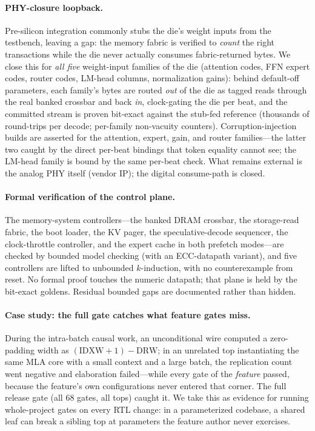 \documentclass[11pt]{article}
\begin{document}
\paragraph{PHY-closure loopback.} Pre-silicon integration commonly stubs the
die's weight inputs from the testbench, leaving a gap: the memory fabric is
verified to \emph{count} the right transactions while the die never actually
consumes fabric-returned bytes. We close this for \emph{all five} weight-input
families of the die (attention codes, FFN expert codes, router codes, LM-head
columns, normalization gains): behind default-off parameters, each family's
bytes are routed \emph{out} of the die as tagged reads through the real banked
crossbar and back \emph{in}, clock-gating the die per beat, and the committed
stream is proven bit-exact against the stub-fed reference (thousands of
round-trips per decode; per-family non-vacuity counters). Corruption-injection
builds are asserted for the attention, expert, gain, and router
families---the latter two caught by the direct per-beat bindings that token
equality cannot see; the LM-head family is bound by the same per-beat check.
What remains external is the analog PHY itself (vendor IP); the digital
consume-path is closed.

\paragraph{Formal verification of the control plane.} The memory-system
controllers---the banked DRAM crossbar, the storage-read fabric, the boot
loader, the KV pager, the speculative-decode sequencer, the clock-throttle
controller, and the expert cache in both prefetch modes---are checked by
bounded model checking (with an
ECC-datapath variant), and five controllers are lifted to unbounded
$k$-induction, with no counterexample from reset. No formal proof touches the
numeric datapath; that plane is held by the bit-exact goldens. Residual bounded
gaps are documented rather than hidden.

\paragraph{Case study: the full gate catches what feature gates miss.} During
the intra-batch causal work, an unconditional wire computed a zero-padding
width as $(\mathrm{IDXW}{+}1)-\mathrm{DRW}$; in an unrelated top instantiating
the same MLA core with a small context and a large batch, the replication count
went negative and elaboration failed---while every gate of the \emph{feature}
passed, because the feature's own configurations never entered that corner. The
full release gate (all 68 gates, all tops) caught it. We take this as evidence
for running whole-project gates on every RTL change: in a parameterized
codebase, a shared leaf can break a sibling top at parameters the feature
author never exercises.
\end{document}
